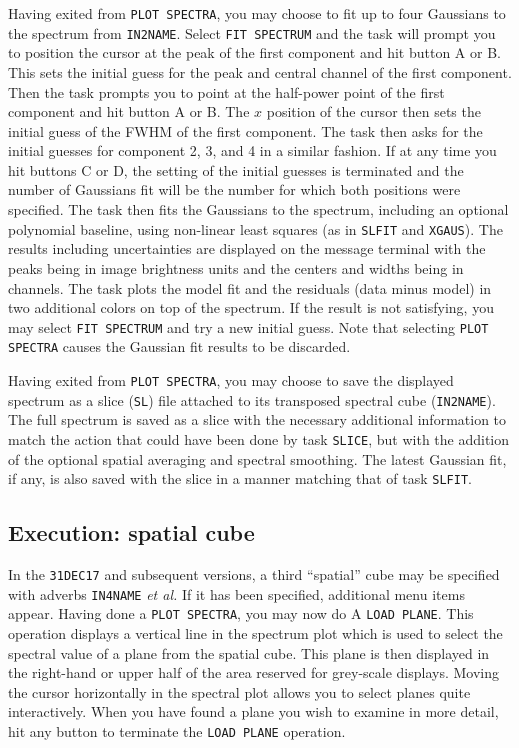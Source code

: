 \documentclass[twoside]{article}
\begin{document}
Having exited from {\tt PLOT SPECTRA}, you may choose to fit up to
four Gaussians to the spectrum from {\tt IN2NAME}.  Select {\tt FIT
  SPECTRUM} and the task will prompt you to position the cursor at the
peak of the first component and hit button A or B.  This sets the
initial guess for the peak and central channel of the first component.
Then the task prompts you to point at the half-power point of the
first component and hit button A or B.  The $x$ position of the cursor
then sets the initial guess of the FWHM of the first component.  The
task then asks for the initial guesses for component 2, 3, and 4 in a
similar fashion.  If at any time you hit buttons C or D, the setting
of the initial guesses is terminated and the number of Gaussians fit
will be the number for which both positions were specified.  The task
then fits the Gaussians to the spectrum, including an optional
polynomial baseline, using non-linear least squares (as in {\tt SLFIT}
and {\tt XGAUS})\@.  The results including uncertainties are displayed
on the message terminal with the peaks being in image brightness units
and the centers and widths being in channels.  The task plots the
model fit and the residuals (data minus model) in two additional
colors on top of the spectrum.  If the result is not satisfying, you
may select {\tt FIT SPECTRUM} and try a new initial guess.  Note that
selecting {\tt PLOT SPECTRA} causes the Gaussian fit results to be
discarded.

Having exited from {\tt PLOT SPECTRA}, you may choose to save the
displayed spectrum as a slice ({\tt SL}) file attached to its
transposed spectral cube ({\tt IN2NAME})\@.  The full spectrum is
saved as a slice with the necessary additional information to match
the action that could have been done by task {\tt SLICE}, but with the
addition of the optional spatial averaging and spectral smoothing.
The latest Gaussian fit, if any, is also saved with the slice in a
manner matching that of task {\tt SLFIT}\@.


\subsection{Execution: spatial cube}

In the {\tt 31DEC17} and subsequent versions, a third ``spatial'' cube
may be specified with adverbs {\tt IN4NAME} {\it et al.}  If it has
been specified, additional menu items appear.  Having done a {\tt PLOT
  SPECTRA}, you may now do A {\tt LOAD PLANE}\@.  This operation
displays a vertical line in the spectrum plot which is used to select
the spectral value of a plane from the spatial cube.  This plane is
then displayed in the right-hand or upper half of the area reserved
for grey-scale displays.  Moving the cursor horizontally in the
spectral plot allows you to select planes quite interactively.  When
you have found a plane you wish to examine in more detail, hit any
button to terminate the {\tt LOAD PLANE} operation.
\end{document}
